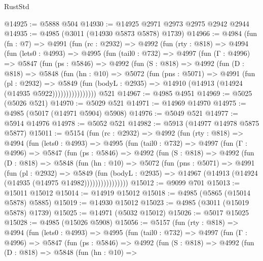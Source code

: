 \begin{lexlean}{RustStd}
\begin{coremodule}
@14925 := @5888 @504
@14930 := @14925 @2971 @2973 @2975 @2942 @2944
@14935 := @4985 (@3011 (@14930 @5873 @5878) @1739)
@14966 := @4984
    (fun (fn : @7) =>
    @4991
      (fun (rc : @2932) =>
      @4992
        (fun (rty : @818) =>
        @4994
          (fun (lets0 : @4993) =>
          @4995
            (fun (tail0 : @732) =>
            @4997
              (fun (Γ : @4996) =>
              @5847
                (fun (ps : @5846) =>
                @4992
                  (fun (S : @818) =>
                  @4992
                    (fun (D : @818) =>
                    @5848
                      (fun (hn : @10) =>
                      @5072
                        (fun (pns : @5071) =>
                        @4991
                          (fun (pl : @2932) =>
                          @5849
                            (fun (bodyL : @2935) =>
                            @14910 (@14913 (@14924 (@14935 @5922))))))))))))))))
    @521
@14967 := @4985 @4951
@14969 := @5025 (@5026 @521)
@14970 := @5029 @521
@14971 := @14969 @14970
@14975 := @4985 (@5017 (@14971 @5904) @5908)
@14976 := @5049 @521
@14977 := @5914 @14976
@14978 := @5052 @521
@14982 := @5913 (@14977 @14978 @5875 @5877)
@15011 := @5154
    (fun (rc : @2932) =>
    @4992
      (fun (rty : @818) =>
      @4994
        (fun (lets0 : @4993) =>
        @4995
          (fun (tail0 : @732) =>
          @4997
            (fun (Γ : @4996) =>
            @5847
              (fun (ps : @5846) =>
              @4992
                (fun (S : @818) =>
                @4992
                  (fun (D : @818) =>
                  @5848
                    (fun (hn : @10) =>
                    @5072
                      (fun (pns : @5071) =>
                      @4991
                        (fun (pl : @2932) =>
                        @5849
                          (fun (bodyL : @2935) =>
                          @14967 (@14913 (@14924 (@14935 (@14975 @14982))))))))))))))))
@15012 := @9099 @701
@15013 := @15011 @15012
@15014 := @14919 @15012
@15018 := @4985 (@5865 (@15014 @5878) @5885)
@15019 := @14930 @15012
@15023 := @4985 (@3011 (@15019 @5878) @1739)
@15025 := @14971 (@5032 @15012)
@15026 := @5017 @15025
@15028 := @4985 (@15026 @5908)
@15056 := @5157
    (fun (rty : @818) =>
    @4994
      (fun (lets0 : @4993) =>
      @4995
        (fun (tail0 : @732) =>
        @4997
          (fun (Γ : @4996) =>
          @5847
            (fun (ps : @5846) =>
            @4992
              (fun (S : @818) =>
              @4992
                (fun (D : @818) =>
                @5848
                  (fun (hn : @10) =>

\end{coremodule}
\end{lexlean}
